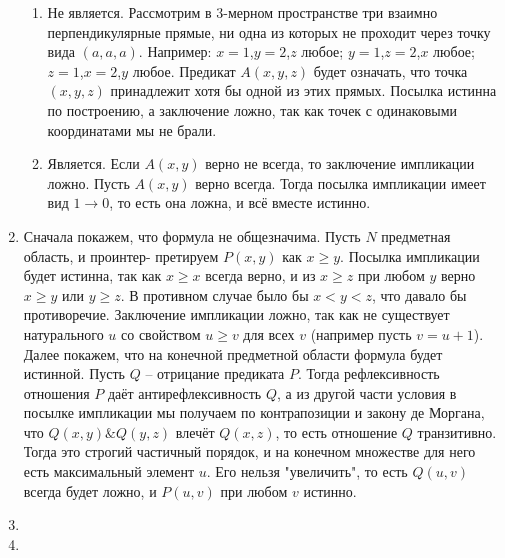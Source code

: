 \documentclass[11pt]{article}
\begin{document}
\begin{enumerate}
\begin{enumerate}
			\item Не является. Рассмотрим в 3-мерном пространстве три взаимно перпендикулярные прямые, ни одна из которых не проходит через точку вида $(a,a,a)$. Например: $x=1$,$y=2$,$z$ любое; $y=1$,$z=2$,$x$ любое; $z=1$,$x=2$,$y$ любое. Предикат $A(x,y,z)$ будет означать, что точка $(x,y,z)$ принадлежит хотя бы одной из этих прямых. Посылка истинна по построению, а заключение ложно, так как точек с одинаковыми координатами мы не брали.
			
			\item Является. Если $A(x,y)$ верно не всегда, то заключение импликации ложно. Пусть $A(x,y)$ верно всегда. Тогда посылка импликации имеет вид $1\to 0$, то есть она ложна, и всё вместе истинно.
		\end{enumerate}
	\item Сначала покажем, что формула не общезначима. Пусть $N$ предметная область, и проинтер- претируем $P(x,y)$ как $x\ge y$. Посылка импликации будет истинна, так как $x\ge x$ всегда верно, и из $x\ge z$ при любом $y$ верно $x\ge y$ или $y\ge z$. В противном случае было бы $x < y < z$, что давало бы противоречие. Заключение импликации ложно, так как не существует натурального $u$ со свойством $u\ge v$ для всех $v$ (например пусть $v=u+1$). Далее покажем, что на конечной предметной области формула будет истинной. Пусть $Q$ -- отрицание предиката $P$. Тогда рефлексивность отношения $P$ даёт антирефлексивность $Q$, а из другой части условия в посылке импликации мы получаем по контрапозиции и закону де Моргана, что $Q(x,y)\& Q(y,z)$ влечёт $Q(x,z)$, то есть отношение $Q$ транзитивно. Тогда это строгий частичный порядок, и на конечном множестве для него есть максимальный элемент $u$. Его нельзя "увеличить", то есть $Q(u,v)$ всегда будет ложно, и $P(u,v)$ при любом $v$ истинно.
	\item 
	\item
	\end{enumerate}
\end{document}
